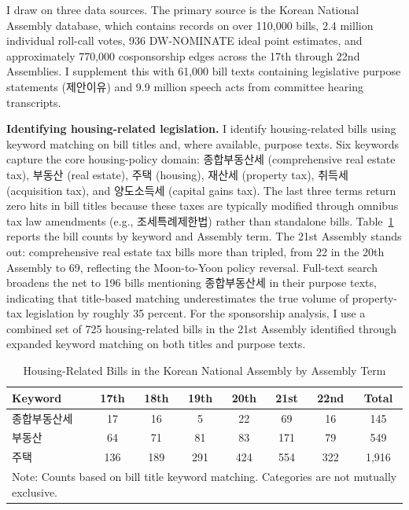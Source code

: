 \documentclass[11pt]{article}
\begin{document}
I draw on three data sources. The primary source is the Korean National Assembly database, which contains records on over 110,000 bills, 2.4 million individual roll-call votes, 936 DW-NOMINATE ideal point estimates, and approximately 770,000 cosponsorship edges across the 17th through 22nd Assemblies. I supplement this with 61,000 bill texts containing legislative purpose statements (제안이유) and 9.9 million speech acts from committee hearing transcripts.

\textbf{Identifying housing-related legislation.} I identify housing-related bills using keyword matching on bill titles and, where available, purpose texts. Six keywords capture the core housing-policy domain: 종합부동산세 (comprehensive real estate tax), 부동산 (real estate), 주택 (housing), 재산세 (property tax), 취득세 (acquisition tax), and 양도소득세 (capital gains tax). The last three terms return zero hits in bill titles because these taxes are typically modified through omnibus tax law amendments (e.g., 조세특례제한법) rather than standalone bills. Table~\ref{tab:bills} reports the bill counts by keyword and Assembly term. The 21st Assembly stands out: comprehensive real estate tax bills more than tripled, from 22 in the 20th Assembly to 69, reflecting the Moon-to-Yoon policy reversal. Full-text search broadens the net to 196 bills mentioning 종합부동산세 in their purpose texts, indicating that title-based matching underestimates the true volume of property-tax legislation by roughly 35 percent. For the sponsorship analysis, I use a combined set of 725 housing-related bills in the 21st Assembly identified through expanded keyword matching on both titles and purpose texts.

\begin{table}[H]
\centering
\caption{Housing-Related Bills in the Korean National Assembly by Assembly Term}
\label{tab:bills}
\begin{tabular}{lcccccc c}
\toprule
Keyword & 17th & 18th & 19th & 20th & 21st & 22nd & Total \\
\midrule
종합부동산세 & 17 & 16 & 5 & 22 & 69 & 16 & 145 \\
부동산           & 64 & 71 & 81 & 83 & 171 & 79 & 549 \\
주택              & 136 & 189 & 291 & 424 & 554 & 322 & 1,916 \\
\bottomrule
\multicolumn{8}{l}{\footnotesize Note: Counts based on bill title keyword matching. Categories are not mutually exclusive.}
\end{tabular}
\end{table}
\end{document}
